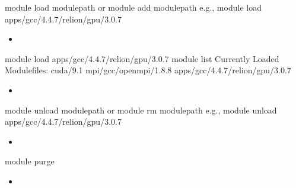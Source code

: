 \documentclass[letterpaper,10pt,english]{sphinxmanual}
\begin{document}
\begin{sphinxVerbatim}[commandchars=\\\{\}]
\PYGZdl{}\PYGZgt{} module load \PYGZlt{}module\PYGZus{}path\PYGZgt{}
or
\PYGZdl{}\PYGZgt{} module add \PYGZlt{}module\PYGZus{}path\PYGZgt{}
e.g., \PYGZdl{}\PYGZgt{} module load apps/gcc/4.4.7/relion/gpu/3.0.7
\end{sphinxVerbatim}
\begin{itemize}
\item {} 

\end{itemize}

\begin{sphinxVerbatim}[commandchars=\\\{\}]
\PYGZdl{}\PYGZgt{} module load apps/gcc/4.4.7/relion/gpu/3.0.7
\PYGZdl{}\PYGZgt{} module list
Currently Loaded Modulefiles:
 cuda/9.1                           mpi/gcc/openmpi/1.8.8              apps/gcc/4.4.7/relion/gpu/3.0.7
\end{sphinxVerbatim}
\begin{itemize}
\item {} 

\end{itemize}

\begin{sphinxVerbatim}[commandchars=\\\{\}]
\PYGZdl{}\PYGZgt{} module unload \PYGZlt{}module\PYGZus{}path\PYGZgt{}
or
\PYGZdl{}\PYGZgt{} module rm \PYGZlt{}module\PYGZus{}path\PYGZgt{}
e.g., \PYGZdl{}\PYGZgt{} module unload apps/gcc/4.4.7/relion/gpu/3.0.7
\end{sphinxVerbatim}
\begin{itemize}
\item {} 

\end{itemize}

\begin{sphinxVerbatim}[commandchars=\\\{\}]
\PYGZdl{}\PYGZgt{} module purge
\end{sphinxVerbatim}
\begin{itemize}
\item {} 

\end{itemize}
\end{document}
